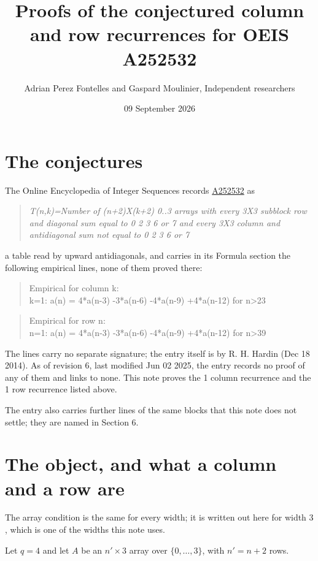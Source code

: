 \documentclass[11pt]{article}
\title{Proofs of the conjectured column and row recurrences for OEIS A252532}
\author{Adrian Perez Fontelles and Gaspard Moulinier, Independent researchers}
\date{09 September 2026}
\theoremstyle{definition}
\begin{document}
\maketitle
\section{The conjectures}

The Online Encyclopedia of Integer Sequences records \href{https://oeis.org/A252532}{A252532} as

\begin{quote}\itshape T(n,k)=Number of (n+2)X(k+2) 0..3 arrays with every 3X3 subblock row and diagonal sum equal to 0 2 3 6 or 7 and every 3X3 column and antidiagonal sum not equal to 0 2 3 6 or 7\end{quote}

a table read by upward antidiagonals, and carries in its Formula section the following empirical lines, none of them proved there:

\begin{quote}\ttfamily Empirical for column k:\\
k=1: a(n) = 4*a(n-3) -3*a(n-6) -4*a(n-9) +4*a(n-12) for n>23\end{quote}

\begin{quote}\ttfamily Empirical for row n:\\
n=1: a(n) = 4*a(n-3) -3*a(n-6) -4*a(n-9) +4*a(n-12) for n>39\end{quote}

The lines carry no separate signature; the entry itself is by R. H. Hardin (Dec 18 2014). As of revision 6, last modified Jun 02 2025, the entry records no proof of any of them and links to none. This note proves the 1 column recurrence and the 1 row recurrence listed above.

The entry also carries further lines of the same blocks that this note does not settle; they are named in Section 6.

\section{The object, and what a column and a row are}

The array condition is the same for every width; it is written out here for width $3$, which is one of the widths this note uses.

Let $q = 4$ and let $A$ be an $n' \times 3$ array over $\{0,\dots,3\}$, with $n' = n + 2$ rows.
\end{document}
